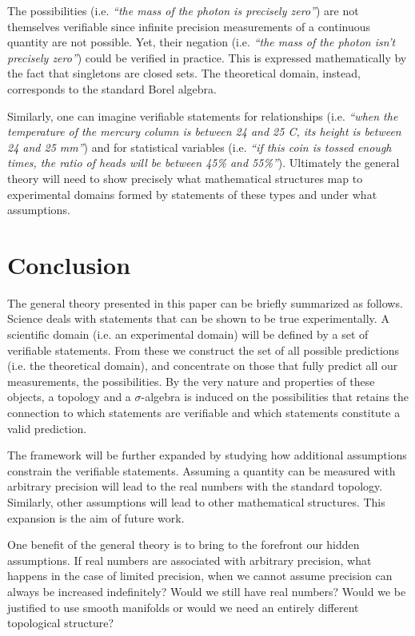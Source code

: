 \documentclass[letterpaper]{article}
\theoremstyle{plain}%
\theoremstyle{definition}
\theoremstyle{remark}
\numberwithin{equation}{section}
\newcommand{\statement}[1] {\emph{``#1''}}
\begin{document}
The possibilities (i.e. \statement{the mass of the photon is precisely zero}) are not themselves verifiable since infinite precision measurements of a continuous quantity are not possible. Yet, their negation (i.e. \statement{the mass of the photon isn't precisely zero}) could be verified in practice. This is expressed mathematically by the fact that singletons are closed sets. The theoretical domain, instead, corresponds to the standard Borel algebra.

Similarly, one can imagine verifiable statements for relationships (i.e. \statement{when the temperature of the mercury column is between 24 and 25 C, its height is between 24 and 25 mm}) and for statistical variables (i.e. \statement{if this coin is tossed enough times, the ratio of heads will be between 45\% and 55\%}). Ultimately the general theory will need to show precisely what mathematical structures map to experimental domains formed by statements of these types and under what assumptions.

\section{Conclusion}

The general theory presented in this paper can be briefly summarized as follows. Science deals with statements that can be shown to be true experimentally. A scientific domain (i.e. an experimental domain) will be defined by a set of verifiable statements. From these we construct the set of all possible predictions (i.e. the theoretical domain), and concentrate on those that fully predict all our measurements, the possibilities. By the very nature and properties of these objects, a topology and a $\sigma$-algebra is induced on the possibilities that retains the connection to which statements are verifiable and which statements constitute a valid prediction.

The framework will be further expanded by studying how additional assumptions constrain the verifiable statements. Assuming a quantity can be measured with arbitrary precision will lead to the real numbers with the standard topology. Similarly, other assumptions will lead to other mathematical structures. This expansion is the aim of future work.

One benefit of the general theory is to bring to the forefront our hidden assumptions. If real numbers are associated with arbitrary precision, what happens in the case of limited precision, when we cannot assume precision can always be increased indefinitely? Would we still have real numbers? Would we be justified to use smooth manifolds or would we need an entirely different topological structure?
\end{document}
